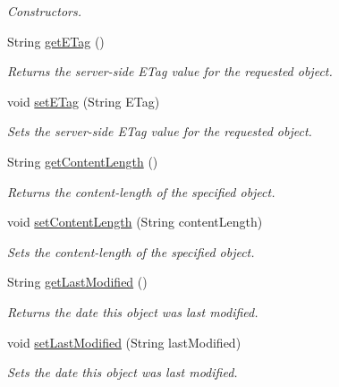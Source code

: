 \begin{DoxyCompactItemize}
\begin{DoxyCompactList}\small\item\em Constructors. \end{DoxyCompactList}\item 
String \hyperlink{classorg_1_1jcs_1_1dss_1_1main_1_1Objectdata_a894fcf2cc8c03acff4277b6ebefacf0d}{get\+E\+Tag} ()
\begin{DoxyCompactList}\small\item\em Returns the server-\/side E\+Tag value for the requested object. \end{DoxyCompactList}\item 
void \hyperlink{classorg_1_1jcs_1_1dss_1_1main_1_1Objectdata_ada7dc88099964eae9b77dfd728aa361f}{set\+E\+Tag} (String E\+Tag)
\begin{DoxyCompactList}\small\item\em Sets the server-\/side E\+Tag value for the requested object. \end{DoxyCompactList}\item 
String \hyperlink{classorg_1_1jcs_1_1dss_1_1main_1_1Objectdata_aa97930f1180fcabaeb1d69be65040855}{get\+Content\+Length} ()
\begin{DoxyCompactList}\small\item\em Returns the content-\/length of the specified object. \end{DoxyCompactList}\item 
void \hyperlink{classorg_1_1jcs_1_1dss_1_1main_1_1Objectdata_ab163a90ca40e1bb30c8bf214971cce91}{set\+Content\+Length} (String content\+Length)
\begin{DoxyCompactList}\small\item\em Sets the content-\/length of the specified object. \end{DoxyCompactList}\item 
String \hyperlink{classorg_1_1jcs_1_1dss_1_1main_1_1Objectdata_a1c866b50b52702d132bfac7b7bcc651b}{get\+Last\+Modified} ()
\begin{DoxyCompactList}\small\item\em Returns the date this object was last modified. \end{DoxyCompactList}\item 
void \hyperlink{classorg_1_1jcs_1_1dss_1_1main_1_1Objectdata_a183880961360686273ef4d020d369d6c}{set\+Last\+Modified} (String last\+Modified)
\begin{DoxyCompactList}\small\item\em Sets the date this object was last modified. \end{DoxyCompactList}\item 

\end{DoxyCompactItemize}
